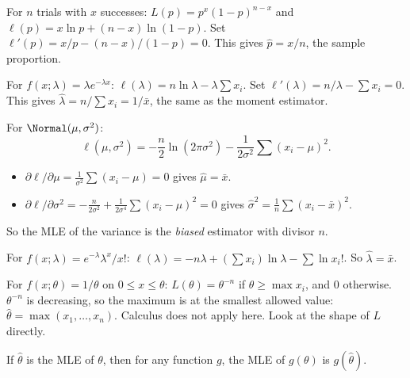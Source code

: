 \begin{example}[Bernoulli]\label{ex:mlebern}
For $n$ trials with $x$ successes: $L(p)=p^x(1-p)^{n-x}$ and $\ell(p)=x\ln p+(n-x)\ln(1-p)$. Set $\ell'(p)=x/p-(n-x)/(1-p)=0$. This gives $\hat{p}=x/n$, the sample proportion.
\end{example}

\begin{example}[Exponential]\label{ex:mleexp}
For $f(x;\lambda)=\lambda e^{-\lambda x}$: $\ell(\lambda)=n\ln\lambda-\lambda\sum x_i$. Set $\ell'(\lambda)=n/\lambda-\sum x_i=0$. This gives $\hat\lambda=n/\sum x_i=1/\bar{x}$, the same as the moment estimator.
\end{example}

\begin{example}[Normal]\label{ex:mlenormal}
For $\Normal(\mu,\sigma^2)$:
\[ \ell(\mu,\sigma^2)=-\frac n2\ln(2\pi\sigma^2)-\frac1{2\sigma^2}\sum(x_i-\mu)^2. \]
\begin{itemize}
  \item $\partial\ell/\partial\mu=\frac1{\sigma^2}\sum(x_i-\mu)=0$ gives $\hat\mu=\bar{x}$.
  \item $\partial\ell/\partial\sigma^2=-\frac n{2\sigma^2}+\frac1{2\sigma^4}\sum(x_i-\mu)^2=0$ gives $\hat\sigma^2=\frac1n\sum(x_i-\bar{x})^2$.
\end{itemize}
So the MLE of the variance is the \emph{biased} estimator with divisor $n$.
\end{example}

\begin{example}[Poisson]
For $f(x;\lambda)=e^{-\lambda}\lambda^x/x!$: $\ell(\lambda)=-n\lambda+(\sum x_i)\ln\lambda-\sum\ln x_i!$. So $\hat\lambda=\bar{x}$.
\end{example}

\begin{example}\label{ex:mleunif}
For $f(x;\theta)=1/\theta$ on $0\le x\le\theta$: $L(\theta)=\theta^{-n}$ if $\theta\ge\max x_i$, and $0$ otherwise. $\theta^{-n}$ is decreasing, so the maximum is at the smallest allowed value: $\hat\theta=\max(x_1,\dots,x_n)$. Calculus does not apply here. Look at the shape of $L$ directly.
\end{example}

\begin{theorem}\label{thm:invariance}
If $\hat\theta$ is the MLE of $\theta$, then for any function $g$, the MLE of $g(\theta)$ is $g(\hat\theta)$.
\end{theorem}

